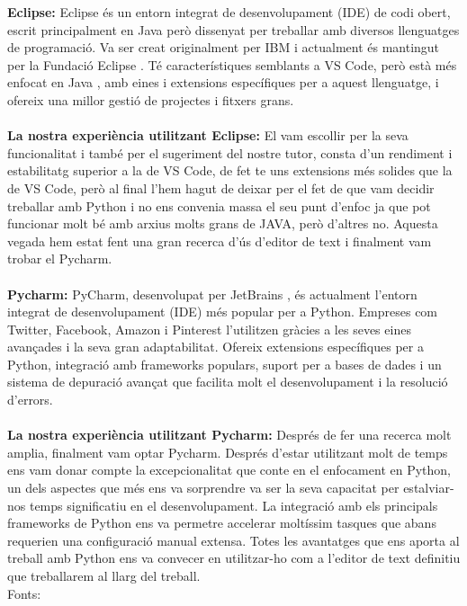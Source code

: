 \textbf{Eclipse: }
Eclipse és un entorn integrat de desenvolupament (IDE) \cite{IDE} de codi obert, escrit principalment en Java però dissenyat per treballar amb diversos llenguatges de programació. Va ser creat originalment per IBM \cite{IBM_} i actualment és mantingut per la Fundació Eclipse \cite{Fundation}. Té característiques semblants a VS Code, però està més enfocat en Java \cite{JAVA}, amb eines i extensions específiques per a aquest llenguatge, i ofereix una millor gestió de projectes i fitxers grans. \\ \\
\textbf{La nostra experiència utilitzant Eclipse:}
El vam escollir per la seva funcionalitat i també per el sugeriment del nostre tutor, consta d'un rendiment i estabilitatg superior a la de VS Code, de fet te uns extensions més solides que la de VS Code, però al final l'hem hagut de deixar per el fet de que vam decidir treballar amb Python i no ens convenia massa el seu punt d'enfoc ja que pot funcionar molt bé amb arxius molts grans de JAVA, però d'altres no. Aquesta vegada hem estat fent una gran recerca d'ús d'editor de text i finalment vam trobar el Pycharm. \\ \\
\textbf{Pycharm: }
PyCharm, desenvolupat per JetBrains \cite{Jet}, és actualment l’entorn integrat de desenvolupament (IDE) més popular per a Python. Empreses com Twitter, Facebook, Amazon i Pinterest l’utilitzen gràcies a les seves eines avançades i la seva gran adaptabilitat. Ofereix extensions específiques per a Python, integració amb frameworks populars, suport per a bases de dades i un sistema de depuració avançat que facilita molt el desenvolupament i la resolució d’errors.\\ \\
\textbf{La nostra experiència utilitzant Pycharm:}
Després de fer una recerca molt amplia, finalment vam optar Pycharm. Després d'estar utilitzant molt de temps ens vam donar compte la excepcionalitat que conte en el enfocament en Python, un dels aspectes que més ens va sorprendre va ser la seva capacitat per estalviar-nos temps significatiu en el desenvolupament. La integració amb els principals frameworks de Python ens va permetre accelerar moltíssim tasques que abans requerien una configuració manual extensa.  Totes les avantatges que ens aporta al treball amb Python  ens va convecer en utilitzar-ho com a l'editor de text definitiu que treballarem al llarg del treball.\\
Fonts: \cite{VSCodeilessevesavantatges} \cite{FundacióEclipse} \cite{Totl'hoquehasdesaberdelPycharm} \cite{ToteslesnovetatsdePycharm}

